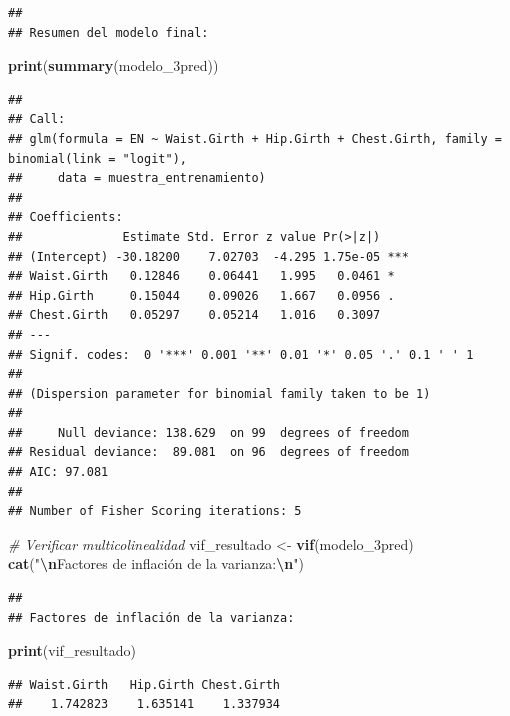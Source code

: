 \documentclass[
]{article}
\newenvironment{Shaded}{\begin{snugshade}}{\end{snugshade}}
\newcommand{\CommentTok}[1]{\textcolor[rgb]{0.56,0.35,0.01}{\textit{#1}}}
\newcommand{\FunctionTok}[1]{\textcolor[rgb]{0.13,0.29,0.53}{\textbf{#1}}}
\newcommand{\NormalTok}[1]{#1}
\newcommand{\OtherTok}[1]{\textcolor[rgb]{0.56,0.35,0.01}{#1}}
\newcommand{\SpecialCharTok}[1]{\textcolor[rgb]{0.81,0.36,0.00}{\textbf{#1}}}
\newcommand{\StringTok}[1]{\textcolor[rgb]{0.31,0.60,0.02}{#1}}
\begin{document}
\begin{verbatim}
## 
## Resumen del modelo final:
\end{verbatim}

\begin{Shaded}
\begin{Highlighting}[]
\FunctionTok{print}\NormalTok{(}\FunctionTok{summary}\NormalTok{(modelo\_3pred))}
\end{Highlighting}
\end{Shaded}

\begin{verbatim}
## 
## Call:
## glm(formula = EN ~ Waist.Girth + Hip.Girth + Chest.Girth, family = binomial(link = "logit"), 
##     data = muestra_entrenamiento)
## 
## Coefficients:
##              Estimate Std. Error z value Pr(>|z|)    
## (Intercept) -30.18200    7.02703  -4.295 1.75e-05 ***
## Waist.Girth   0.12846    0.06441   1.995   0.0461 *  
## Hip.Girth     0.15044    0.09026   1.667   0.0956 .  
## Chest.Girth   0.05297    0.05214   1.016   0.3097    
## ---
## Signif. codes:  0 '***' 0.001 '**' 0.01 '*' 0.05 '.' 0.1 ' ' 1
## 
## (Dispersion parameter for binomial family taken to be 1)
## 
##     Null deviance: 138.629  on 99  degrees of freedom
## Residual deviance:  89.081  on 96  degrees of freedom
## AIC: 97.081
## 
## Number of Fisher Scoring iterations: 5
\end{verbatim}

\begin{Shaded}
\begin{Highlighting}[]
\CommentTok{\# Verificar multicolinealidad}
\NormalTok{vif\_resultado }\OtherTok{\textless{}{-}} \FunctionTok{vif}\NormalTok{(modelo\_3pred)}
\FunctionTok{cat}\NormalTok{(}\StringTok{"}\SpecialCharTok{\textbackslash{}n}\StringTok{Factores de inflación de la varianza:}\SpecialCharTok{\textbackslash{}n}\StringTok{"}\NormalTok{)}
\end{Highlighting}
\end{Shaded}

\begin{verbatim}
## 
## Factores de inflación de la varianza:
\end{verbatim}

\begin{Shaded}
\begin{Highlighting}[]
\FunctionTok{print}\NormalTok{(vif\_resultado)}
\end{Highlighting}
\end{Shaded}

\begin{verbatim}
## Waist.Girth   Hip.Girth Chest.Girth 
##    1.742823    1.635141    1.337934
\end{verbatim}
\end{document}
